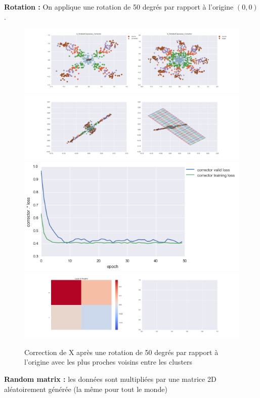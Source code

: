 {\Large \textbf{Rotation :}} On applique une rotation de 50 degrés par rapport à l'origine $(0,0)$.

\begin{figure}[H] %
\centering
\includegraphics[width=\linewidth]{fig/24-05-2016/X/X_RotatedClasswise_Corrector-DATA.png}
\includegraphics[width=\linewidth]{fig/24-05-2016/X/X_RotatedClasswise_Corrector-GridCheck.png}
\includegraphics[width=0.45\linewidth]{fig/24-05-2016/X/X_RotatedClasswise_Corrector-Learning_curve.png}
\includegraphics[width=\linewidth]{fig/24-05-2016/X/X_RotatedClasswise_Corrector-W.png}
\caption{Correction de X après une rotation de 50 degrés par rapport à l'origine avec les plus proches voisins entre les clusters}
\label{fig:recap-X-rot-classwise}
\end{figure}

{\Large \textbf{Random matrix :}} les données sont multipliées par une matrice 2D aléatoirement générée
 (la même pour tout le monde)

